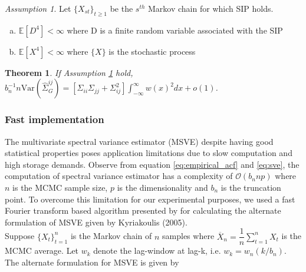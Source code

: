 \documentclass[11pt]{article}
\newcommand{\E}{\mathbb{E}}
\newcommand{\Var}{\text{Var}}
\newtheorem{theorem}{Theorem}
\theoremstyle{remark}
\newtheorem{ass}{Assumption}
\begin{document}
\begin{ass} \label{ass:variance_cal}
Let $\{X_{st}\}_{t \geq 1}$ be the $s^{th}$ Markov chain for which SIP holds. 
\begin{enumerate}[a.]
    \item $\E[D^4] < \infty$ where D is a finite random variable associated with the SIP
    \item $\E[X^4] < \infty$ where $\{X\}$ is the stochastic process
\end{enumerate}
\end{ass}


\begin{theorem} \label{th:G-SVE_variance}
 If Assumption \ref{ass:variance_cal} hold, $b_n^{-1}{n}\Var \left(\hat{\Sigma}_{G}^{ij} \right) = [\Sigma_{ii}\Sigma_{jj} + \Sigma_{ij}^2]\int_{-\infty}^{\infty}w(x)^2dx  + o(1)$.
\end{theorem}




\subsubsection{Fast implementation} %
\label{ssub:fast_implementation}

The multivariate spectral variance estimator (MSVE) despite having good statistical properties poses application limitations due to slow computation and high storage demands. Observe from equation \ref{eq:empirical_acf} and \ref{eq:sve}, the computation of spectral variance estimator has a complexity of $\mathcal{O}(b_n n p)$ where $n$ is the MCMC sample size, $p$ is the dimensionality and $b_n$ is the truncation point. To overcome this limitation for our experimental purposes, we used a fast Fourier transform based algorithm presented by \cite{heberle2017fast} for calculating the alternate formulation of MSVE given by Kyriakoulis (2005).\\

Suppose $\{X_t\}_{t=1}^n$ is the Markov chain of $n$ samples where $\overline{X}_n = \dfrac{1}{n}\sum_{t=1}^{n}X_t$ is the MCMC average. Let $w_k$ denote the lag-window at lag-k, i.e. $w_k = w_n(k/b_n)$. The alternate formulation for MSVE is given by
\end{document}
